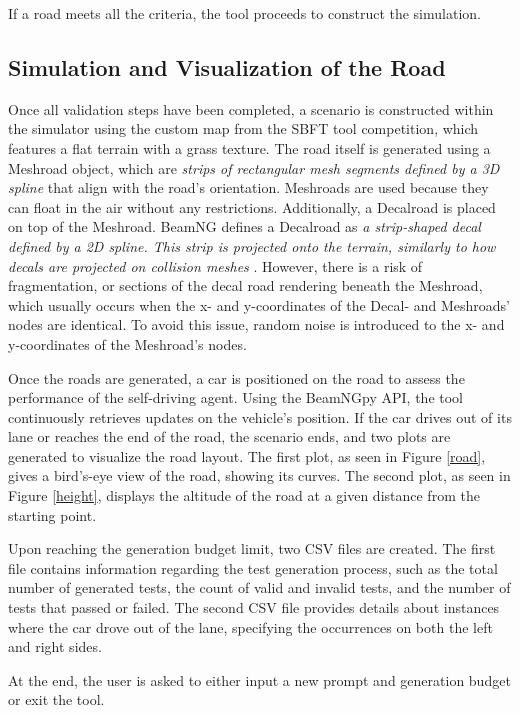 If a road meets all the criteria, the tool proceeds to construct the simulation.

\subsection{Simulation and Visualization of the Road}
Once all validation steps have been completed, a scenario is constructed within the simulator using the custom map from the SBFT tool competition, which features a flat terrain with a grass texture. The road itself is generated using a Meshroad object, which are \textit{strips of rectangular mesh segments defined by a 3D spline} \cite{BeamNG} that align with the road's orientation. Meshroads are used because they can float in the air without any restrictions. Additionally, a Decalroad is placed on top of the Meshroad. BeamNG defines a Decalroad as \textit{a strip-shaped decal defined by a 2D spline. This strip is projected onto the terrain, similarly to how decals are projected on collision meshes} \cite{BeamNG}. However, there is a risk of fragmentation, or sections of the decal road rendering beneath the Meshroad, which usually occurs when the x- and y-coordinates of the Decal- and Meshroads' nodes are identical. To avoid this issue, random noise is introduced to the x- and y-coordinates of the Meshroad's nodes. 

Once the roads are generated, a car is positioned on the road to assess the performance of the self-driving agent. Using the BeamNGpy API, the tool continuously retrieves updates on the vehicle's position. If the car drives out of its lane or reaches the end of the road, the scenario ends, and two plots are generated to visualize the road layout. The first plot, as seen in Figure \ref{road}, gives a bird's-eye view of the road, showing its curves. The second plot, as seen in Figure \ref{height}, displays the altitude of the road at a given distance from the starting point.

Upon reaching the generation budget limit, two CSV files are created. The first file contains information regarding the test generation process, such as the total number of generated tests, the count of valid and invalid tests, and the number of tests that passed or failed. The second CSV file provides details about instances where the car drove out of the lane, specifying the occurrences on both the left and right sides.

At the end, the user is asked to either input a new prompt and generation budget or exit the tool.

